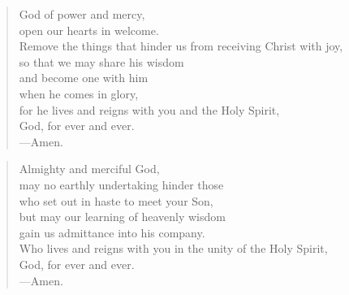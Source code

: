 \prayer

\setlength{\vleftmargin}{\prayerleftmargini}

\begin{verse}
God of power and mercy,\\
open our hearts in welcome.\\
Remove the things that hinder us from receiving Christ with joy,\\
so that we may share his wisdom\\
and become one with him\\
when he comes in glory,\\
for he lives and reigns with you and the Holy Spirit,\\
God, for ever and ever.\\
{\color{red}---\thinspace}Amen.
\end{verse}


\begin{verse}
Almighty and merciful God,\\
may no earthly undertaking hinder those\\
who set out in haste to meet your Son,\\
but may our learning of heavenly wisdom\\
gain us admittance into his company.\\
Who lives and reigns with you in the unity of the Holy Spirit,\\
God, for ever and ever.\\
{\color{red}---\thinspace}Amen.
\end{verse}

\setlength{\vleftmargin}{\defleftmargini}